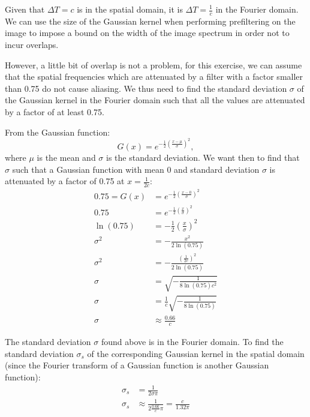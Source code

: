 \documentclass[tikz,14pt,fleqn]{article}
\begin{document}
Given that $\Delta T = c$ is in the spatial domain, it is $\Delta T = \frac{1}{c}$ in the Fourier domain. We can use the size of the Gaussian kernel when performing prefiltering on the image to impose a bound on the width of the image spectrum in order not to incur overlaps. 

However, a little bit of overlap is not a problem, for this exercise, we can assume that the spatial frequencies which are attenuated by a filter with a factor smaller than 0.75 do not cause aliasing.
We thus need to find the standard deviation $\sigma$ of the Gaussian kernel in the Fourier domain such that all the values are attenuated by a factor of at least 0.75.

From the Gaussian function:
\begin{equation*}
    G(x) = e^{-\frac12(\frac{x-\mu}{\sigma})^2},
\end{equation*}where $\mu$ is the mean and $\sigma$ is the standard deviation. 
We want then to find that $\sigma$ such that a Gaussian function with mean 0 and standard deviation $\sigma$ is attenuated by a factor of 0.75 at $x = \frac{1}{2c}$:
\begin{align*}
    0.75 = G(x) &= e^{-\frac12(\frac{x-0}{\sigma})^2} \\
    0.75 &= e^{-\frac12(\frac{x}{\sigma})^2} \\
    \ln(0.75) &= -\frac12(\frac{x}{\sigma})^2 \\
    \sigma^2 &= -\frac{x^2}{2\ln(0.75)} \\
    \sigma^2 &= -\frac{(\frac{1}{2c})^2}{2\ln(0.75)} \\
    \sigma &= \sqrt{-\frac{1}{8\ln(0.75)c^2}} \\
    \sigma &= \frac{1}{c}\sqrt{-\frac{1}{8\ln(0.75)}}\\
    \sigma &\approx \frac{0.66}{c}
\end{align*}

The standard deviation $\sigma$ found above is in the Fourier domain. To find the standard deviation $\sigma_s$ of the corresponding Gaussian kernel in the spatial domain (since the Fourier transform of a Gaussian function is another Gaussian function):
\begin{align*}
    \sigma_s&=\frac{1}{2\sigma \pi} \\
    \sigma_s&\approx\frac{1}{2\frac{0.66}{c} \pi} = \frac{c}{1.32\pi} \\
\end{align*}
\end{document}
